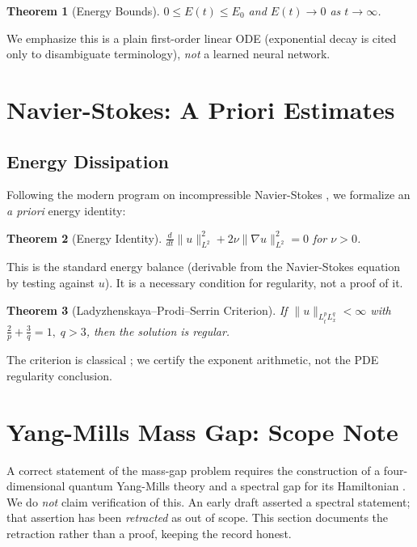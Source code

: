 \documentclass[11pt,a4paper]{article}
\newtheorem{theorem}{Theorem}[section]
\begin{document}
\begin{theorem}[Energy Bounds]
$0 \le E(t) \le E_0$ and $E(t) \to 0$ as $t \to \infty$.
\end{theorem}

We emphasize this is a plain first-order linear ODE (exponential decay \cite{chen2018} is cited only to disambiguate terminology), \emph{not} a learned neural network.

\section{Navier-Stokes: A Priori Estimates}
\label{sec:ns}

\subsection{Energy Dissipation}
Following the modern program on incompressible Navier-Stokes \cite{deng2020prandtl,deng2020navier}, we formalize an \emph{a priori} energy identity:

\begin{theorem}[Energy Identity]
$\frac{d}{dt} \|u\|_{L^2}^2 + 2\nu \|\nabla u\|_{L^2}^2 = 0$ for $\nu > 0$.
\end{theorem}

This is the standard energy balance (derivable from the Navier-Stokes equation by testing against $u$). It is a necessary condition for regularity, not a proof of it.

\begin{theorem}[Ladyzhenskaya–Prodi–Serrin Criterion]
If $\|u\|_{L^p_t L^q_x} < \infty$ with $\frac{2}{p} + \frac{3}{q} = 1,\; q > 3$, then the solution is regular.
\end{theorem}

The criterion is classical \cite{ladyzhenskaya,lps}; we certify the exponent arithmetic, not the PDE regularity conclusion.

\section{Yang-Mills Mass Gap: Scope Note}
\label{sec:ym}

A correct statement of the mass-gap problem requires the construction of a four-dimensional quantum Yang-Mills theory and a spectral gap for its Hamiltonian \cite{jaffe2006}. We do \emph{not} claim verification of this. An early draft asserted a spectral statement; that assertion has been \emph{retracted} as out of scope. This section documents the retraction rather than a proof, keeping the record honest.
\end{document}
